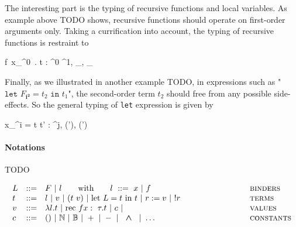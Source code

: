 \documentclass[a4paper,11pt,oneside]{article}
\theoremstyle{plain}
\newcommand{\bwedge}{\boldsymbol{~\wedge~}}
\newcommand{\bvee}{\boldsymbol{~\vee~}}
\begin{document}
The interesting part is the typing of recursive functions and local
variables.  As example above TODO shows, recursive functions should operate
on first-order arguments only. Taking a currification into account, the
typing of recursive functions is restraint to
	\begin{footnotesize}
		{\vdash {}  f~x_{\tau^0}~. t : 
			\tau^{0} \stackrel{\theta, \top_{\rho}}{\rightarrow}\tau^{1}, 
			\bot_{\theta}, 
			\bot_{\rho}}
	\end{footnotesize}
Finally, as we illustrated in another example TODO, in expressions such as 
"$\texttt{let } F_{\boldsymbol{i^{2}}} = t_2 \texttt{ in } t_1 $",
the second-order term $t_2$ should free from any possible side-effects.
So the general typing of \texttt{let} expression is given by
	\begin{footnotesize}
		\infrule[T$_{ML^{^2}}$-Let] 
			{\vdash t_1 : \tau^i, \theta, \rho 
			\qquad \vdash t' : \tau^j, \theta', \rho' 
			\qquad (i = 2) \Rightarrow 
			\boldsymbol{(\theta = \bot_{\theta}\bwedge \rho = \bot_{\rho})}} 
			{\vdash {} x_{\tau^i} = t \text{ in } t' 
				: \tau^{j}, 
				(\theta \bvee \theta'), 
				(\rho \bvee \rho')}
	\end{footnotesize}

\paragraph*{Notations}

TODO

\begin{displaymath}
	\begin{array}{lll@{\hspace*{3cm}}l}
			L &::=& F ~|~ l \qquad \text{with}\qquad l~::=~ x ~|~ f &
        \textsc{binders} \\ 
      t &::=& l ~|~ v~|~(t~v) ~|~\text{let } L = t 
         t ~|~ r := v ~|~ !r & 
        \textsc{terms}\\ 
      v &::=& \lambda l. t ~|~
        \text{rec } f x :~\tau . t ~|~ c ~|~ & 
        \textsc{values} \\ 
      c &::=&
        \text{()} ~|~ \mathbb{N}~|~\mathbb{B}~|~+~|~-~|~\bwedge~| ~\dots &
        \textsc{constants} \\
	\end{array}
\end{displaymath}
\end{document}
